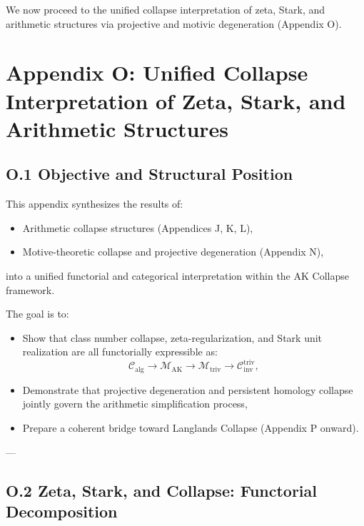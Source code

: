 \documentclass[11pt]{article}
\begin{document}
We now proceed to the unified collapse interpretation of zeta, Stark, and arithmetic structures via projective and motivic degeneration (Appendix O).




\section*{Appendix O: Unified Collapse Interpretation of Zeta, Stark, and Arithmetic Structures}

\subsection*{O.1 Objective and Structural Position}

This appendix synthesizes the results of:
\begin{itemize}
  \item Arithmetic collapse structures (Appendices J, K, L),
  \item Motive-theoretic collapse and projective degeneration (Appendix N),
\end{itemize}
into a unified functorial and categorical interpretation within the AK Collapse framework.

The goal is to:
\begin{itemize}
  \item Show that class number collapse, zeta-regularization, and Stark unit realization are all functorially expressible as:
  \[
  \mathcal{C}_{\mathrm{alg}} \longrightarrow \mathcal{M}_{\mathrm{AK}} \longrightarrow \mathcal{M}_{\mathrm{triv}} \longrightarrow \mathcal{C}_{\mathrm{inv}}^{\mathrm{triv}},
  \]
  \item Demonstrate that projective degeneration and persistent homology collapse jointly govern the arithmetic simplification process,
  \item Prepare a coherent bridge toward Langlands Collapse (Appendix P onward).
\end{itemize}

---

\subsection*{O.2 Zeta, Stark, and Collapse: Functorial Decomposition}
\end{document}
